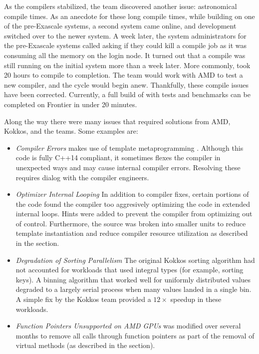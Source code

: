 As the compilers stabilized, the team discovered another issue: astronomical compile times.
As an anecdote for these long compile times, while building on one of the pre-Exascale systems, a second system came online, and \vtkm development switched over to the newer system.
A week later, the system administrators for the pre-Exascale systems called asking if they could kill a compile job as it was consuming all the memory on the login node.
It turned out that a \vtkm compile was still running on the initial system more than a week later.
More commonly, \vtkm took 20 hours to compile to completion.
The team would work with AMD to test a new compiler, and the cycle would begin anew.
Thankfully, these compile issues have been corrected.
Currently, a full build of \vtkm with tests and benchmarks can be completed on Frontier in under 20 minutes.

Along the way there were many issues that required solutions from AMD, Kokkos, and the \vtkm teams. Some examples are:
\begin{itemize}
\item \emph{Compiler Errors}
  \vtkm makes use of template metaprogramming \cite{Meyers2005}.
  Although this code is fully C++14 compliant, it sometimes flexes the compiler in unexpected ways and may cause internal compiler errors.
  Resolving these requires dialog with the compiler engineers.
\item \emph{Optimizer Internal Looping}
  In addition to compiler fixes, certain portions of the code found the compiler too aggresively optimizing the code in extended internal loops.
  Hints were added to prevent the compiler from optimizing out of control.
  Furthermore, the \vtkm source was broken into smaller units to reduce template instantiation and reduce compiler resource utilization as described in the  section.
\item \emph{Degradation of Sorting Parallelism}
  The original Kokkos sorting algorithm had not accounted for \vtkm workloads that used integral types (for example, sorting keys).
  A binning algorithm that worked well for uniformly distributed values degraded to a largely serial process when many values landed in a single bin.
  A simple fix by the Kokkos team provided a $12\times$ speedup in these workloads.
\item \emph{Function Pointers Unsupported on AMD GPUs}
  \vtkm was modified over several months to remove all calls through function pointers as part of the removal of virtual methods (as described in the  section).
\end{itemize}


